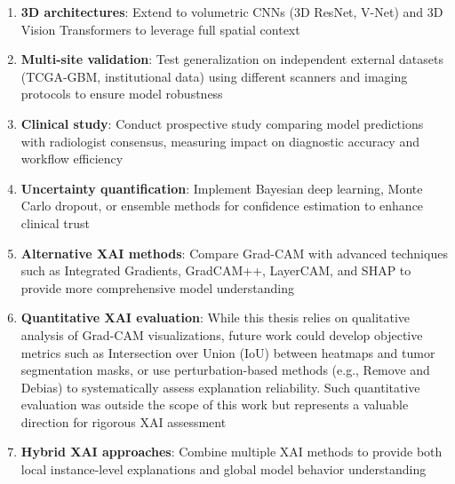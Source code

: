\begin{enumerate}
    \item \textbf{3D architectures}: Extend to volumetric CNNs (3D ResNet, V-Net) and 3D Vision Transformers to leverage full spatial context
    \item \textbf{Multi-site validation}: Test generalization on independent external datasets (TCGA-GBM, institutional data) using different scanners and imaging protocols to ensure model robustness
    \item \textbf{Clinical study}: Conduct prospective study comparing model predictions with radiologist consensus, measuring impact on diagnostic accuracy and workflow efficiency
    \item \textbf{Uncertainty quantification}: Implement Bayesian deep learning, Monte Carlo dropout, or ensemble methods for confidence estimation to enhance clinical trust
    \item \textbf{Alternative XAI methods}: Compare Grad-CAM with advanced techniques such as Integrated Gradients, GradCAM++, LayerCAM, and SHAP to provide more comprehensive model understanding
    \item \textbf{Quantitative XAI evaluation}: While this thesis relies on qualitative analysis of Grad-CAM visualizations, future work could develop objective metrics such as Intersection over Union (IoU) between heatmaps and tumor segmentation masks, or use perturbation-based methods (e.g., Remove and Debias) to systematically assess explanation reliability. Such quantitative evaluation was outside the scope of this work but represents a valuable direction for rigorous XAI assessment
    \item \textbf{Hybrid XAI approaches}: Combine multiple XAI methods to provide both local instance-level explanations and global model behavior understanding
\end{enumerate}

